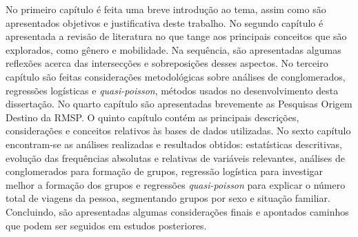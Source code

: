 No primeiro capítulo é feita uma breve introdução ao tema, assim como são apresentados objetivos e justificativa deste trabalho.
No segundo capítulo é apresentada a revisão de literatura no que tange aos principais conceitos que são explorados, como gênero e mobilidade. Na sequência, são apresentadas algumas reflexões acerca das intersecções e sobreposições desses aspectos.
No terceiro capítulo são feitas considerações metodológicas sobre análises de conglomerados, regressões logísticas e \textit{quasi-poisson}, métodos usados no desenvolvimento desta dissertação.
No quarto capítulo são apresentadas brevemente as Pesquisas Origem Destino da RMSP.
O quinto capítulo contém as principais descrições, considerações e conceitos relativos às bases de dados utilizadas.
No sexto capítulo encontram-se as análises realizadas e resultados obtidos: estatísticas descritivas, evolução das frequências absolutas e relativas de variáveis relevantes, análises de conglomerados para formação de grupos, regressão logística para investigar melhor a formação dos grupos e regressões \textit{quasi-poisson} para explicar o número total de viagens da pessoa, segmentando grupos por sexo e situação familiar.
Concluindo, são apresentadas algumas considerações finais e apontados caminhos que podem ser seguidos em estudos posteriores.

